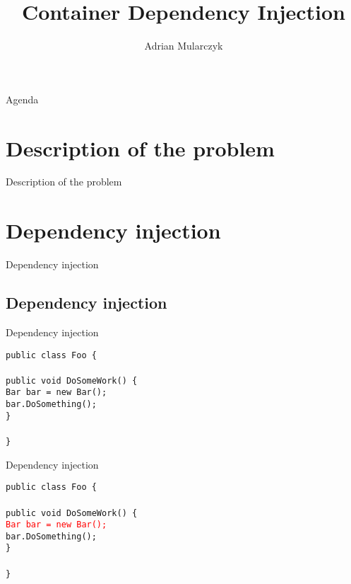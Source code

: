 \documentclass{beamer}
\title[]
{Container Dependency Injection}
\author[Adrian Mularczyk]{Adrian Mularczyk}
\date{}
\newcommand{\code}[1]{{\texttt{#1}}}
\begin{document}
\begin{frame}
  \titlepage 
\end{frame}

\begin{frame}{Agenda}
  \tableofcontents
\end{frame}

\section{Description of the problem}

\begin{frame}{}
	\begin{center}
		\Huge{Description of the problem}
	\end{center}
\end{frame}

\section{Dependency injection}

\begin{frame}{}
	\begin{center}
		\Huge{Dependency injection}
	\end{center}
\end{frame}

\subsection*{Dependency injection}

\begin{frame}{Dependency injection}
     \begin{large}
	\code{public class Foo \{}\\ \quad
	\code{}\\ \quad
		\code{public void DoSomeWork() \{}\\ \qquad
		\code{Bar bar = new Bar();}\\ \qquad
		\code{bar.DoSomething();}\\ \quad
		\code{\}}\\
	\code{}\\
	\code{\}}
     \end{large}
\end{frame}

\begin{frame}{Dependency injection}
     \begin{large}
	\code{public class Foo \{}\\\ \quad
	\code{}\\ \quad
		\code{public void DoSomeWork() \{}\\ \qquad
		\code{\textcolor{red}{Bar bar = new Bar();}}\\ \qquad
		\code{bar.DoSomething();}\\ \quad
		\code{\}}\\
	\code{}\\
	\code{\}}
     \end{large}
\end{frame}
\end{document}

